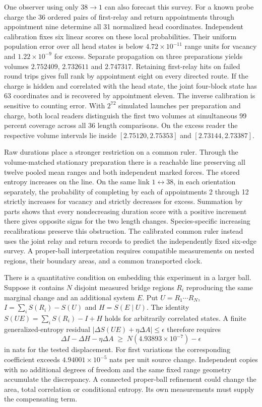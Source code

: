 \documentclass[11pt]{article}
\begin{document}
One observer using only $38\to1$ can also forecast this survey.
For a known probe charge the 36 ordered pairs of first-relay and
return appointments through appointment nine determine all 31 normalized
head coordinates. Independent calibration fixes six linear scores on
these local probabilities. Their uniform population error over all
head states is below $4.72\times10^{-11}$ range units for vacancy
and $1.22\times10^{-9}$ for excess. Separate propagation on three
preparations yields volumes $2.752409$, $2.732611$ and $2.747317$.
Retaining first-relay hits on failed round trips gives full rank by
appointment eight on every directed route. If the charge is hidden
and correlated with the head state, the joint four-block state has
63 coordinates and is recovered by appointment eleven. The inverse
calibration is sensitive to counting error. With $2^{72}$ simulated
launches per preparation and charge, both local readers distinguish
the first two volumes at simultaneous 99 percent coverage across all
36 length comparisons. On the excess reader the respective volume
intervals lie inside $[2.75120,2.75353]$ and $[2.73144,2.73387]$.

Raw durations place a stronger restriction on a common ruler.
Through the volume-matched stationary preparation there is a reachable
line preserving all twelve pooled mean ranges and both independent
marked forces. The stored entropy increases on the line. On the same
link $1\leftrightarrow38$, in each orientation separately, the
probability of completing by each of appointments 2 through 12
strictly increases for vacancy and strictly decreases for excess.
Summation by parts shows that every nondecreasing duration score with
a positive increment there gives opposite signs for the two length
changes. Species-specific increasing recalibrations preserve this
obstruction. The calibrated common ruler instead uses the joint relay
and return records to predict the independently fixed six-edge survey.
A proper-ball interpretation requires compatible measurements on
nested regions, their boundary areas, and a common transported clock.



There is a quantitative condition on embedding this experiment in
a larger ball. Suppose it contains $N$ disjoint measured bridge
regions $R_i$ reproducing the same marginal change and an additional
system $E$. Put $U=R_1\cdots R_N$, $I=\sum_iS(R_i)-S(U)$ and
$H=S(E\mid U)$. The identity $S(UE)=\sum_i S(R_i)-I+H$ holds for
arbitrarily correlated states. A finite generalized-entropy
residual $|\Delta S(UE)+\eta\Delta A|\le\epsilon$ therefore requires
\[
 \Delta I-\Delta H-\eta\Delta A
 \;\ge\; N(4.93893\times10^{-7})-\epsilon
\]
in nats for the tested displacement. For first variations the
corresponding coefficient exceeds $4.94001\times10^{-5}$ nats
per unit source change. Independent copies with no additional
degrees of freedom and the same fixed range geometry accumulate
the discrepancy. A connected proper-ball refinement could change
the area, total correlation or conditional entropy. Its own
measurements must supply the compensating term.
\end{document}
